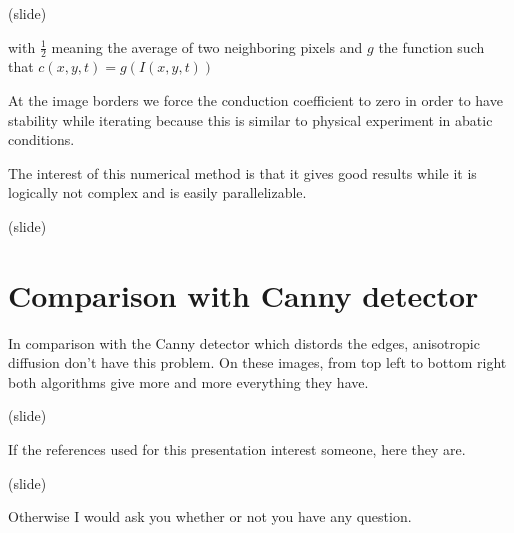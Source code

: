\documentclass{article}
\begin{document}
(slide)


with $\frac{1}{2}$ meaning the average of two neighboring pixels and $g$ the function such that $c(x,y,t)=g(I(x,y,t))$

At the image borders we force the conduction coefficient to zero in order to have stability while iterating because this is similar to physical experiment in abatic conditions.

The interest of this numerical method is that it gives good results while it is logically not complex and is easily parallelizable.


(slide)

\section{Comparison with Canny detector}

In comparison with the Canny detector which distords the edges, anisotropic diffusion don't have this problem. On these images, from top left to bottom right both algorithms give more and more everything they have.

(slide)

If the references used for this presentation interest someone, here they are.

(slide)

Otherwise I would ask you whether or not you have any question.
\end{document}
